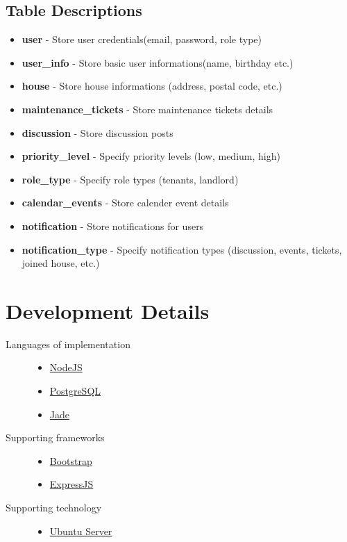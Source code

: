 \documentclass[12pt]{article}
\begin{document}
\subsection{Table Descriptions}
\begin{itemize}
    \item \textbf{user} - Store user credentials(email, password, role type)
    \item \textbf{user\_info} - Store basic user informations(name, birthday etc.)
    \item \textbf{house} - Store house informations (address, postal code, etc.)
    \item \textbf{maintenance\_tickets} - Store maintenance tickets details
    \item \textbf{discussion} - Store discussion posts
    \item \textbf{priority\_level} - Specify priority levels (low, medium, high)
    \item \textbf{role\_type} - Specify role types (tenants, landlord)
    \item \textbf{calendar\_events} - Store calender event details
    \item \textbf{notification} - Store notifications for users
    \item \textbf{notification\_type} - Specify notification types (discussion, events, tickets, joined house, etc.)

\end{itemize}

%
\section{Development Details}
\begin{description}
  \item[Languages of implementation] \hfill
    \begin{itemize}
      \item \href{https://nodejs.org/en/}{NodeJS}
      \item \href{http://www.postgresql.org/}{PostgreSQL}
      \item \href{http://jade-lang.com/}{Jade}
    \end{itemize}
  \item[Supporting frameworks] \hfill
    \begin{itemize}
      \item \href{http://getbootstrap.com/}{Bootstrap}
      \item \href{http://expressjs.com/}{ExpressJS}
    \end{itemize}
  \item[Supporting technology] \hfill
    \begin{itemize}
      \item \href{http://www.ubuntu.com/server}{Ubuntu Server}
    \end{itemize}
\end{description}
\end{document}
